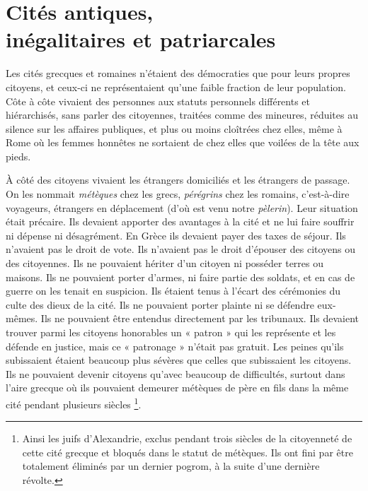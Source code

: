 

\chapter[Cités antiques, inégalitaires et patriarcales]{Cités antiques,\\inégalitaires et patriarcales}


Les cités grecques et romaines n'étaient des démocraties que pour
leurs propres citoyens, et ceux-ci ne représentaient qu'une faible fraction de leur
population. Côte à côte vivaient des personnes aux statuts personnels
différents et hiérarchisés, sans parler des citoyennes, traitées comme des
mineures, réduites au silence sur les affaires publiques, et plus ou moins
cloîtrées chez elles, même à Rome où les femmes honnêtes ne sortaient
de chez elles que voilées de la tête aux pieds.

À côté des citoyens vivaient les étrangers domiciliés et les étrangers
de passage. On les nommait \emph{métèques} chez les grecs, \emph{pérégrins} chez les
romains, c'est-à-dire voyageurs, étrangers en déplacement (d'où est venu
notre \emph{pèlerin}). Leur situation était précaire. Ils devaient apporter des avantages
à la cité et ne lui faire souffrir ni dépense ni désagrément. En Grèce
ils devaient payer des taxes de séjour. Ils n'avaient pas le droit de vote. Ils
n'avaient pas le droit d'épouser des citoyens ou des citoyennes. Ils ne
pouvaient hériter d'un citoyen ni posséder terres ou maisons. Ils ne pouvaient
porter d'armes, ni faire partie des soldats, et en cas de guerre on
les tenait en suspicion. Ils étaient tenus à l'écart des cérémonies du culte
des dieux de la cité. Ils ne pouvaient porter plainte ni se défendre eux-mêmes.
Ils ne pouvaient être entendus directement par les tribunaux. Ils
devaient trouver parmi les citoyens honorables un « patron » qui les représente
et les défende en justice, mais ce « patronage » n'était pas gratuit.
Les peines qu'ils subissaient étaient beaucoup plus sévères que celles
que subissaient les citoyens. Ils ne pouvaient devenir citoyens qu'avec
beaucoup de difficultés, surtout dans l'aire grecque où ils pouvaient demeurer
métèques de père en fils dans la même cité pendant plusieurs siècles%
\footnote{Ainsi
les juifs d'Alexandrie, exclus pendant trois siècles de la citoyenneté de cette cité grecque et bloqués dans le statut de métèques. Ils ont fini par être totalement éliminés par un dernier pogrom, à la suite d'une dernière révolte.}.

